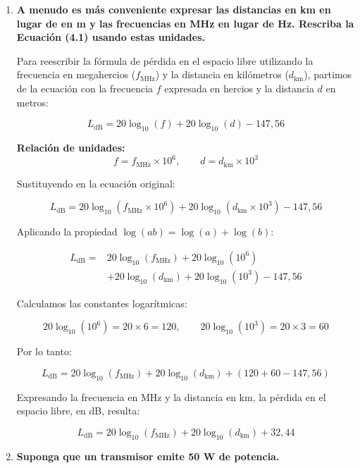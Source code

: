 \documentclass[11pt,a4paper]{article}
\begin{document}
\begin{enumerate}[label=4.\arabic*), itemsep=0.3cm]
  \item
        \textbf{A menudo es más conveniente expresar las distancias en km en lugar de en m y las frecuencias en MHz en lugar de Hz. Rescriba la Ecuación (4.1) usando estas unidades.}

        Para reescribir la fórmula de pérdida en el espacio libre utilizando la frecuencia en megahercios ($f_{\text{MHz}}$) y la distancia en kilómetros ($d_{\text{km}}$), partimos de la ecuación con la frecuencia $f$ expresada en hercios y la distancia $d$ en metros:

        \[
          L_{\text{dB}} = 20\log_{10}(f) + 20\log_{10}(d) - 147{,}56
        \]

        \textbf{Relación de unidades:}
        \[
          f = f_{\text{MHz}} \times 10^6,
          \qquad d = d_{\text{km}} \times 10^3
        \]

        Sustituyendo en la ecuación original:

        \[
          L_{\text{dB}} = 20\log_{10}(f_{\text{MHz}} \times 10^6)
          + 20\log_{10}(d_{\text{km}} \times 10^3) - 147{,}56
        \]

        Aplicando la propiedad $\log(ab) = \log(a) + \log(b)$:

        \[
          \begin{aligned}
            L_{\text{dB}} ={} & 20\log_{10}(f_{\text{MHz}}) + 20\log_{10}(10^6)             \\
                              & + 20\log_{10}(d_{\text{km}}) + 20\log_{10}(10^3) - 147{,}56
          \end{aligned}
        \]

        Calculamos las constantes logarítmicas:

        \[
          20\log_{10}(10^6) = 20 \times 6 = 120,
          \qquad 20\log_{10}(10^3) = 20 \times 3 = 60
        \]

        Por lo tanto:

        \[
          L_{\text{dB}} = 20\log_{10}(f_{\text{MHz}})
          + 20\log_{10}(d_{\text{km}}) + (120 + 60 - 147{,}56)
        \]

        Expresando la frecuencia en MHz y la distancia en km, la pérdida en el espacio libre, en dB, resulta:

        \[
          \boxed{L_{\text{dB}} = 20\log_{10}(f_{\text{MHz}})
            + 20\log_{10}(d_{\text{km}}) + 32{,}44}
        \]

  \item
        \textbf{Suponga que un transmisor emite 50 W de potencia.}


\end{enumerate}
\end{document}
